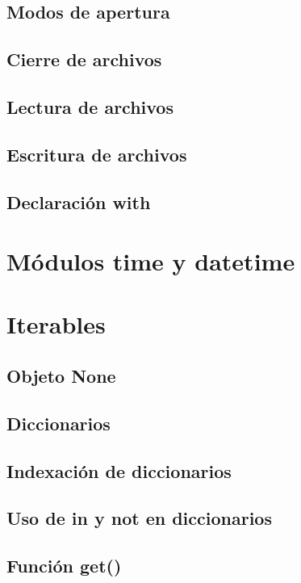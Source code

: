 \documentclass{article}
\begin{document}
\subsection{Modos de apertura}

\subsection{Cierre de archivos}

\subsection{Lectura de archivos}

\subsection{Escritura de archivos}

\subsection{Declaración with}

\newpage\section{Módulos time y datetime}

\newpage\section{Iterables}

\subsection{Objeto None}

\subsection{Diccionarios}

\subsection{Indexación de diccionarios}

\subsection{Uso de in y not en diccionarios}

\subsection{Función get()}
\end{document}
